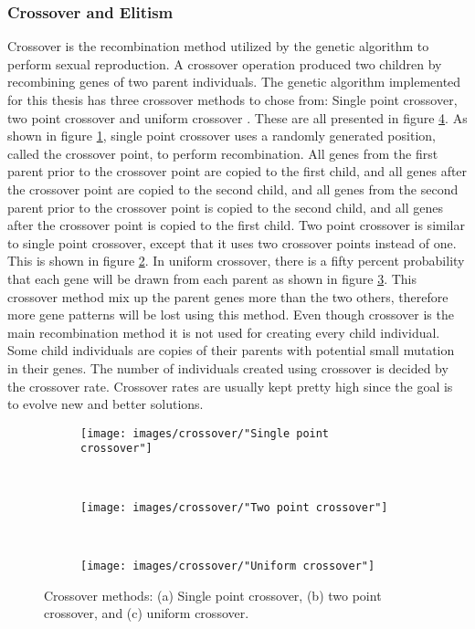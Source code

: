 \subsubsection{Crossover and Elitism}
Crossover is the recombination method utilized by the genetic algorithm to perform sexual reproduction. A crossover operation produced two children by recombining genes of two parent individuals. The genetic algorithm implemented for this thesis has three crossover methods to chose from: Single point crossover, two point crossover and uniform crossover \citep{Magalhaes-Mendes}. These are all presented in figure \ref{figure:crossover methods}. As shown in figure \ref{figure:single point crossover}, single point crossover uses a randomly generated position, called the crossover point, to perform recombination. All genes from the first parent prior to the crossover point are copied to the first child, and all genes after the crossover point are copied to the second child, and all genes from the second parent prior to the crossover point is copied to the second child, and all genes after the crossover point is copied to the first child. Two point crossover is similar to single point crossover, except that it uses two crossover points instead of one. This is shown in figure \ref{figure:two point crossover}. In uniform crossover, there is a fifty percent probability that each gene will be drawn from each parent as shown in figure \ref{figure:uniform crossover}. This crossover method mix up the parent genes more than the two others, therefore more gene patterns will be lost using this method. Even though crossover is the main recombination method it is not used for creating every child individual. Some child individuals are copies of their parents with potential small mutation in their genes. The number of individuals created using crossover is decided by the crossover rate. Crossover rates are usually kept pretty high since the goal is to evolve new and better solutions. \\


\begin{figure}[h!]
    \centering
    \begin{subfigure}[b]{0.3\textwidth}
        \texttt{[image: images/crossover/"Single point crossover"]}
        \caption{}
        \label{figure:single point crossover}
    \end{subfigure}
    ~ 
    \begin{subfigure}[b]{0.3\textwidth}
        \texttt{[image: images/crossover/"Two point crossover"]}
        \caption{}
        \label{figure:two point crossover}
    \end{subfigure}
    ~
    \begin{subfigure}[b]{0.3\textwidth}
        \texttt{[image: images/crossover/"Uniform crossover"]}
        \caption{}
        \label{figure:uniform crossover}
    \end{subfigure}
    \caption{Crossover methods: (a) Single point crossover, (b) two point crossover, and (c) uniform crossover.}
    \label{figure:crossover methods}
\end{figure}


